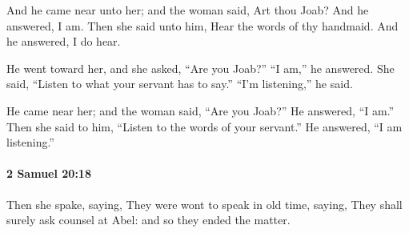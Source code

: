 			\begin{versebox}
					\item[BHS] 
					\item[ASV] And he came near unto her; and the woman said, Art thou Joab? And he answered, I am. Then she said unto him, Hear the words of thy handmaid. And he answered, I do hear.
					\item[NIV] He went toward her, and she asked, “Are you Joab?” “I am,” he answered. She said, “Listen to what your servant has to say.” “I’m listening,” he said.
					\item[NRSV] He came near her; and the woman said, “Are you Joab?” He answered, “I am.” Then she said to him, “Listen to the words of your servant.” He answered, “I am listening.”
			\end{versebox}

		\paragraph{2 Samuel 20:18} %
			\label{2SAMUEL-20-18}

			Then she spake, saying, They were wont to speak in old time, saying, They shall surely ask counsel at Abel: and so they ended the matter.

